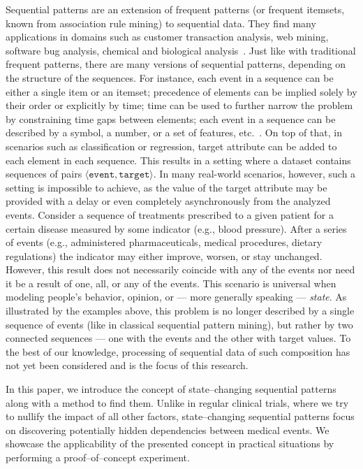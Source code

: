 \documentclass[runningheads,a4paper]{llncs}
\begin{document}
Sequential patterns are an extension of frequent patterns (or frequent itemsets, known from association rule mining) to sequential data.
They find many applications in domains such as customer transaction analysis, web mining, software bug analysis, chemical and biological analysis~\cite{Aggarwal:2014}.
Just like with traditional frequent patterns, there are many versions of sequential patterns, depending on the structure of the sequences.
For instance, each event in a sequence can be either a single item or an itemset; precedence of elements can be implied solely by their order or explicitly by time; time can be used to further narrow the problem by constraining time gaps between elements; each event in a sequence can be described by a symbol, a number, or a set of features, etc.~\cite{Dong:2009}.
On top of that, in scenarios such as classification or regression, target attribute can be added to each element in each sequence.
This results in a setting where a dataset contains sequences of pairs $\langle\texttt{event}, \texttt{target}\rangle$.
In many real-world scenarios, however, such a setting is impossible to achieve, as the value of the target attribute may be provided with a delay or even completely asynchronously from the analyzed events.
Consider a sequence of treatments prescribed to a given patient for a certain disease measured by some indicator (e.g., blood pressure).
After a series of events (e.g., administered pharmaceuticals, medical procedures, dietary regulations) the indicator may either improve, worsen, or stay unchanged.
However, this result does not necessarily coincide with any of the events nor need it be a result of one, all, or any of the events.
This scenario is universal when modeling people's behavior, opinion, or --- more generally speaking --- \textit{state}.
As illustrated by the examples above, this problem is no longer described by a single sequence of events (like in classical sequential pattern mining), but rather by two connected sequences --- one with the events and the other with target values.
To the best of our knowledge, processing of sequential data of such composition has not yet been considered and is the focus of this research.

In this paper, we introduce the concept of state--changing sequential patterns along with a method to find them.
Unlike in regular clinical trials, where we try to nullify the impact of all other factors, state--changing sequential patterns focus on discovering potentially hidden dependencies between medical events.
We showcase the applicability of the presented concept in practical situations by performing a proof--of--concept experiment.
\end{document}
